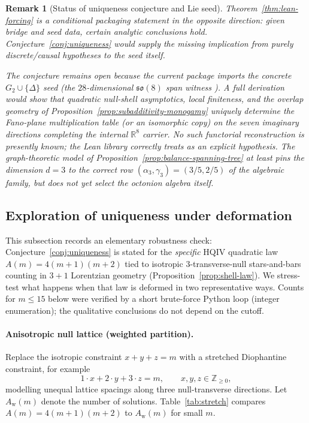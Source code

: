 \documentclass[11pt]{amsart}
\newtheorem{remark}[theorem]{Remark}
\begin{document}
\begin{remark}[Status of uniqueness conjecture and Lie seed]
Theorem~\ref{thm:lean-forcing} is a \emph{conditional} packaging statement in the opposite direction: given bridge and seed data, certain analytic conclusions hold. Conjecture~\ref{conj:uniqueness} would supply the missing implication from purely discrete/causal hypotheses to the seed itself.

The conjecture remains open because the current package imports the concrete \(G_2\cup\{\Delta\}\) seed (the \(28\)-dimensional \(\mathfrak{so}(8)\) span witness ). A full derivation would show that quadratic null-shell asymptotics, local finiteness, and the overlap geometry of Proposition~\ref{prop:subadditivity-monogamy} uniquely determine the Fano-plane multiplication table (or an isomorphic copy) on the seven imaginary directions completing the internal \(\mathbb{R}^8\) carrier. No such functorial reconstruction is presently known; the Lean library correctly treats  as an explicit hypothesis. The graph-theoretic model of Proposition~\ref{prop:balance-spanning-tree} at least pins the dimension \(d=3\) to the correct row \((\alpha_3,\gamma_3)=(3/5,2/5)\) of the algebraic family, but does not yet select the octonion algebra itself.
\end{remark}

\subsection{Exploration of uniqueness under deformation}
\label{subsec:uniqueness-deformation}

This subsection records an elementary robustness check: Conjecture~\ref{conj:uniqueness} is stated for the \emph{specific} HQIV quadratic law \(A(m)=4(m+1)(m+2)\) tied to isotropic \(3\)-transverse-null stars-and-bars counting in \(3{+}1\) Lorentzian geometry (Proposition~\ref{prop:shell-law}). We stress-test what happens when that law is deformed in two representative ways. Counts for \(m\le 15\) below were verified by a short brute-force Python loop (integer enumeration); the qualitative conclusions do not depend on the cutoff.

\paragraph{Anisotropic null lattice (weighted partition).}
Replace the isotropic constraint \(x+y+z=m\) with a stretched Diophantine constraint, for example
\[
1\cdot x+2\cdot y+3\cdot z=m,\qquad x,y,z\in\mathbb{Z}_{\ge 0},
\]
modelling unequal lattice spacings along three null-transverse directions. Let \(A_{\mathrm{w}}(m)\) denote the number of solutions. Table~\ref{tab:stretch} compares \(A(m)=4(m+1)(m+2)\) to \(A_{\mathrm{w}}(m)\) for small \(m\).
\end{document}
